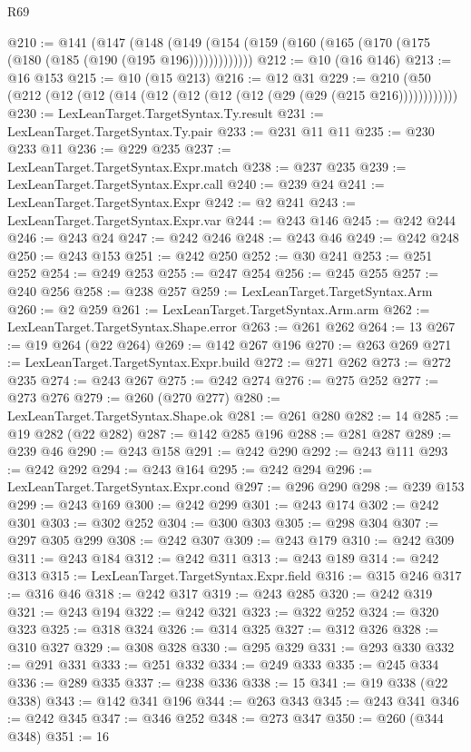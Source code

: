 \begin{lexlean}{R69}
\begin{coremodule}
@210 := @141
    (@147 (@148 (@149 (@154 (@159 (@160 (@165 (@170 (@175 (@180 (@185 (@190 (@195 @196)))))))))))))
@212 := @10 (@16 @146)
@213 := @16 @153
@215 := @10 (@15 @213)
@216 := @12 @31
@229 := @210 (@50 (@212 (@12 (@12 (@14 (@12 (@12 (@12 (@12 (@29 (@29 (@215 @216))))))))))))
@230 := LexLeanTarget.TargetSyntax.Ty.result
@231 := LexLeanTarget.TargetSyntax.Ty.pair
@233 := @231 @11 @11
@235 := @230 @233 @11
@236 := @229 @235
@237 := LexLeanTarget.TargetSyntax.Expr.match
@238 := @237 @235
@239 := LexLeanTarget.TargetSyntax.Expr.call
@240 := @239 @24
@241 := LexLeanTarget.TargetSyntax.Expr
@242 := @2 @241
@243 := LexLeanTarget.TargetSyntax.Expr.var
@244 := @243 @146
@245 := @242 @244
@246 := @243 @24
@247 := @242 @246
@248 := @243 @46
@249 := @242 @248
@250 := @243 @153
@251 := @242 @250
@252 := @30 @241
@253 := @251 @252
@254 := @249 @253
@255 := @247 @254
@256 := @245 @255
@257 := @240 @256
@258 := @238 @257
@259 := LexLeanTarget.TargetSyntax.Arm
@260 := @2 @259
@261 := LexLeanTarget.TargetSyntax.Arm.arm
@262 := LexLeanTarget.TargetSyntax.Shape.error
@263 := @261 @262
@264 := 13
@267 := @19 @264 (@22 @264)
@269 := @142 @267 @196
@270 := @263 @269
@271 := LexLeanTarget.TargetSyntax.Expr.build
@272 := @271 @262
@273 := @272 @235
@274 := @243 @267
@275 := @242 @274
@276 := @275 @252
@277 := @273 @276
@279 := @260 (@270 @277)
@280 := LexLeanTarget.TargetSyntax.Shape.ok
@281 := @261 @280
@282 := 14
@285 := @19 @282 (@22 @282)
@287 := @142 @285 @196
@288 := @281 @287
@289 := @239 @46
@290 := @243 @158
@291 := @242 @290
@292 := @243 @111
@293 := @242 @292
@294 := @243 @164
@295 := @242 @294
@296 := LexLeanTarget.TargetSyntax.Expr.cond
@297 := @296 @290
@298 := @239 @153
@299 := @243 @169
@300 := @242 @299
@301 := @243 @174
@302 := @242 @301
@303 := @302 @252
@304 := @300 @303
@305 := @298 @304
@307 := @297 @305 @299
@308 := @242 @307
@309 := @243 @179
@310 := @242 @309
@311 := @243 @184
@312 := @242 @311
@313 := @243 @189
@314 := @242 @313
@315 := LexLeanTarget.TargetSyntax.Expr.field
@316 := @315 @246
@317 := @316 @46
@318 := @242 @317
@319 := @243 @285
@320 := @242 @319
@321 := @243 @194
@322 := @242 @321
@323 := @322 @252
@324 := @320 @323
@325 := @318 @324
@326 := @314 @325
@327 := @312 @326
@328 := @310 @327
@329 := @308 @328
@330 := @295 @329
@331 := @293 @330
@332 := @291 @331
@333 := @251 @332
@334 := @249 @333
@335 := @245 @334
@336 := @289 @335
@337 := @238 @336
@338 := 15
@341 := @19 @338 (@22 @338)
@343 := @142 @341 @196
@344 := @263 @343
@345 := @243 @341
@346 := @242 @345
@347 := @346 @252
@348 := @273 @347
@350 := @260 (@344 @348)
@351 := 16

\end{coremodule}
\end{lexlean}
